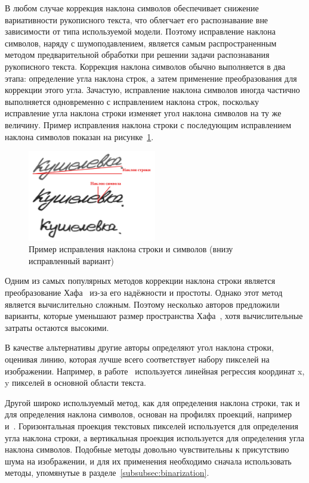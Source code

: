 В любом случае коррекция наклона символов обеспечивает снижение вариативности рукописного текста,
что облегчает его распознавание вне зависимости от типа используемой модели.
Поэтому исправление наклона символов, наряду с шумоподавлением, является самым распространенным методом предварительной обработки при решении задачи распознавания рукописного текста.
Коррекция наклона символов обычно выполняется в два этапа: определение угла наклона строк, а затем применение преобразования для коррекции этого угла.
Зачастую, исправление наклона символов иногда частично выполняется одновременно с исправлением наклона строк,
поскольку исправление угла наклона строки изменяет угол наклона символов на ту же величину.
Пример исправления наклона строки с последующим исправлением наклона символов показан на рисунке~\ref{fig:slope-slant}.

\begin{figure}[h!]
    \centering
    \includegraphics[width=0.5\textwidth]{img/slant-slope}
    \caption{Пример исправления наклона строки и символов (внизу исправленный вариант)}
    \label{fig:slope-slant}
\end{figure}

Одним из самых популярных методов коррекции наклона строки является преобразование Хафа~\cite{duda1972use} из-за его надёжности и простоты.
Однако этот метод является вычислительно сложным.
Поэтому несколько авторов предложили варианты, которые уменьшают размер пространства Хафа~\cite{pal1996improved,boukharouba2017new}, хотя вычислительные затраты остаются высокими.

В качестве альтернативы другие авторы определяют угол наклона строки, оценивая линию, которая лучше всего соответствует набору пикселей на изображении.
Например, в работе~\cite{gupta2014efficient} используется линейная регрессия координат x, y пикселей в основной области текста.

Другой широко используемый метод, как для определения наклона строки, так и для определения наклона символов, основан на профилях проекций, например~\cite{kavallieratou2002skew} и~\cite{pastor2004projection}.
Горизонтальная проекция текстовых пикселей используется для определения угла наклона строки, а вертикальная проекция используется для определения угла наклона символов.
Подобные методы довольно чувствительны к присутствию шума на изображении, и для их применения необходимо сначала использовать методы, упомянутые в разделе~\ref{subsubsec:binarization}.

